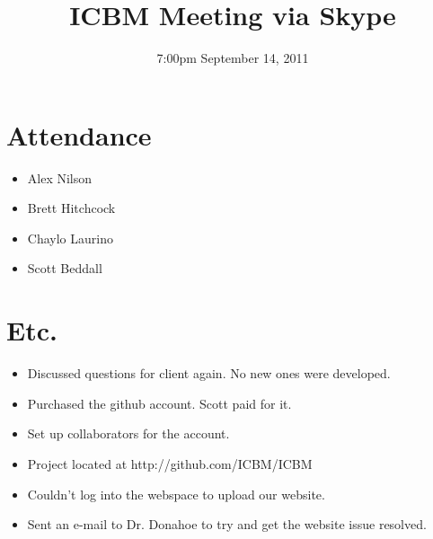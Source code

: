 \documentclass{article}
\begin{document}
\title{ICBM Meeting via Skype}
\date{7:00pm September 14, 2011}
\maketitle

\section{Attendance}
\begin{itemize}
\item Alex Nilson
\item Brett Hitchcock
\item Chaylo Laurino
\item Scott Beddall
\end{itemize}

\section{Etc.}
\begin{itemize}
\item Discussed questions for client again.  No new ones were developed.
\item Purchased the github account.  Scott paid for it.
\item Set up collaborators for the account.
\item Project located at http://github.com/ICBM/ICBM
\item Couldn't log into the webspace to upload our website.
\item Sent an e-mail to Dr. Donahoe to try and get the website issue resolved.
\end{itemize}
\end{document}
